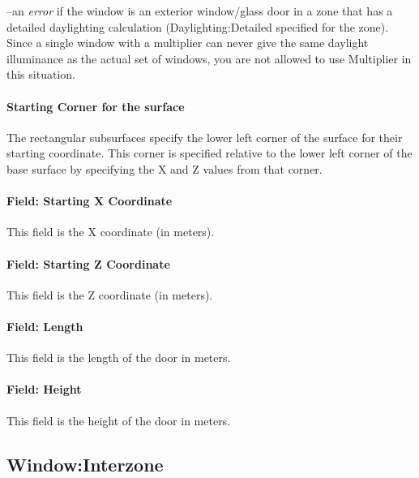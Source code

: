 --an \emph{error} if the window is an exterior window/glass door in a zone that has a detailed daylighting calculation (Daylighting:Detailed specified for the zone). Since a single window with a multiplier can never give the same daylight illuminance as the actual set of windows, you are not allowed to use Multiplier in this situation.

\paragraph{Starting Corner for the surface}\label{starting-corner-for-the-surface-12}

The rectangular subsurfaces specify the lower left corner of the surface for their starting coordinate. This corner is specified relative to the lower left corner of the base surface by specifying the X and Z values from that corner.

\paragraph{Field: Starting X Coordinate}\label{field-starting-x-coordinate-12}

This field is the X coordinate (in meters).

\paragraph{Field: Starting Z Coordinate}\label{field-starting-z-coordinate-12}

This field is the Z coordinate (in meters).

\paragraph{Field: Length}\label{field-length-12}

This field is the length of the door in meters.

\paragraph{Field: Height}\label{field-height-6}

This field is the height of the door in meters.

\subsection{Window:Interzone}\label{windowinterzone}

